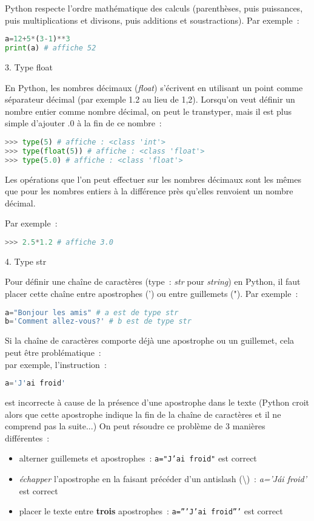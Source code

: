 Python respecte l'ordre mathématique des calculs (parenthèses, puis puissances, puis multiplications et divisons, puis additions et soustractions). Par exemple~:
 \begin{lstlisting}[language=Python]
a=12+5*(3-1)**3 
print(a) # affiche 52
\end{lstlisting}
\begin{h2}3. Type \og float \fg{} \end{h2}
En Python, les nombres décimaux (\textit{float}) s'écrivent en utilisant un point comme séparateur décimal (par exemple 1.2 au lieu de 1,2).
Lorsqu'on veut définir un nombre entier comme nombre décimal, on peut le transtyper, mais il est plus simple d'ajouter \og .0 \fg{} à la fin de ce nombre~:
\begin{lstlisting}[language=Python]
>>> type(5) # affiche : <class 'int'>
>>> type(float(5)) # affiche : <class 'float'>
>>> type(5.0) # affiche : <class 'float'>
\end{lstlisting}
Les opérations que l'on peut effectuer sur les nombres décimaux sont les mêmes que pour les nombres entiers à la différence près qu'elles renvoient un nombre décimal.
\par
Par exemple~:
\begin{lstlisting}[language=Python]
>>> 2.5*1.2 # affiche 3.0
\end{lstlisting}
\begin{h2}4. Type \og str \fg{} \end{h2}
Pour définir une chaîne de caractères (type~: \textit{str} pour \textit{string}) en Python, il faut placer cette chaîne entre apostrophes (') ou entre guillemets ("). Par exemple~:
 \begin{lstlisting}[language=Python]
a="Bonjour les amis" # a est de type str
b='Comment allez-vous?' # b est de type str
\end{lstlisting}
Si la chaîne de caractères comporte déjà une apostrophe ou un guillemet, cela peut être problématique~:\\
par exemple, l'instruction~:
 \begin{lstlisting}[language=Python]
a='J'ai froid'
\end{lstlisting}
est incorrecte à cause de la présence d'une apostrophe dans le texte (Python croit alors que cette apostrophe indique la fin de la chaîne de caractères et il ne comprend pas la suite...)
On peut résoudre ce problème de 3 manières différentes~:
\begin{itemize}
     \item %
     alterner guillemets et apostrophes~: \texttt{a="J'ai froid"} est correct
     \item %
     \textit{échapper} l'apostrophe en la faisant précéder d'un antislash (\textbackslash)~: \textit{a='J\'ai froid'} est correct
     \item %
     placer le texte entre \textbf{trois} apostrophes~: \texttt{a='''J'ai froid'''} est correct
\end{itemize}
